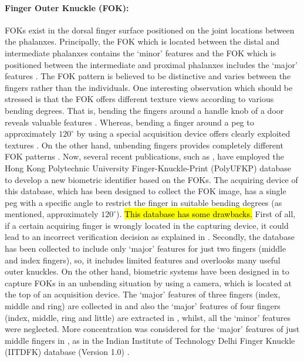 \documentclass[review]{elsarticle}
\begin{document}
	\paragraph{\textbf{Finger Outer Knuckle (FOK):}} FOKs exist in the dorsal finger surface positioned on the joint locations between the phalanxes. Principally, the FOK which is located between the distal and intermediate phalanxes contains the \lq minor' features and the FOK which is positioned between the intermediate and proximal phalanxes includes the \lq major' features \cite{Kumar2014Importance}. The FOK pattern is believed to be distinctive and varies between the fingers rather than the individuals. One interesting observation which should be stressed is that the FOK offers different texture views according to various bending degrees. That is, bending the fingers around a handle knob of a door reveals valuable features \cite{aoyama2013multi}. Whereas, bending a finger around a peg to approximately $120^{\circ}$ by using a special acquisition device offers clearly exploited textures \cite{zhang2012phase,zhang2011ensemble}. On the other hand, unbending fingers provides completely different FOK patterns \cite{Kumar2009Personal}. Now, several recent publications, such as \cite{zhang2009finger,Lin2009Finger,zhang2010online,zhang2011ensemble,zhang2012phase}, have employed the Hong Kong Polytechnic University Finger-Knuckle-Print (PolyUFKP) database \cite{DatabasePolyUFKP} to develop a new biometric identifier based on the FOKs. The acquiring device of this database, which has been designed to collect the FOK image, has a single peg with a specific angle to restrict the finger in suitable bending degrees (as mentioned, approximately $120^{\circ}$). 
	\hl{This database has some drawbacks.} First of all, if a certain acquiring finger is wrongly located in the capturing device, it could lead to an incorrect verification decision as explained in \cite{zhang2012phase}. Secondly, the database has been collected to include only \lq major' features for just two fingers (middle and index fingers), so, it includes limited features and overlooks many useful outer knuckles. On the other hand, biometric systems have been designed in \cite{Wang2008Study,Kumar2009Personal,Kumar2009Human} to capture FOKs in an unbending situation by using a camera, which is located at the top of an acquisition device. The \lq major' features of three fingers (index, middle and ring) are collected in \cite{Wang2008Study} and also the \lq major' features of four fingers (index, middle, ring and little) are extracted in \cite{Kumar2009Personal}, whilst, all the \lq minor' features were neglected. More concentration was considered for the \lq major' features of just middle fingers in \cite{Kumar2009Human}, as in the Indian Institute of Technology Delhi Finger Knuckle (IITDFK) database (Version 1.0) \cite{Databasever1IITDFK}. 
\end{document}
